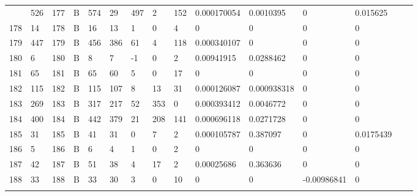 \begin{longtable}{lllllllllllllll}
\begin{comment}
	177 & 526               & 177 & B   & 574               & 29                & 497               & 2    & 152        & 0.000170054    & 0.0010395      & 0             & 0.015625     \\
	178 & 14                & 178 & B   & 16                & 13                & 1                 & 0    & 4          & 0              & 0              & 0             & 0            \\
	179 & 447               & 179 & B   & 456               & 386               & 61                & 4    & 118        & 0.000340107    & 0              & 0             & 0            \\
	180 & 6                 & 180 & B   & 8                 & 7                 & -1                & 0    & 2          & 0.00941915     & 0.0288462      & 0             & 0            \\
	181 & 65                & 181 & B   & 65                & 60                & 5                 & 0    & 17         & 0              & 0              & 0             & 0            \\
	182 & 115               & 182 & B   & 115               & 107               & 8                 & 13   & 31         & 0.000126087    & 0.000938318    & 0             & 0            \\
	183 & 269               & 183 & B   & 317               & 217               & 52                & 353  & 0          & 0.000393412    & 0.0046772      & 0             & 0            \\
	184 & 400               & 184 & B   & 442               & 379               & 21                & 208  & 141        & 0.000696118    & 0.0271728      & 0             & 0            \\
	185 & 31                & 185 & B   & 41                & 31                & 0                 & 7    & 2          & 0.000105787    & 0.387097       & 0             & 0.0175439    \\
	186 & 5                 & 186 & B   & 6                 & 4                 & 1                 & 0    & 2          & 0              & 0              & 0             & 0            \\
	187 & 42                & 187 & B   & 51                & 38                & 4                 & 17   & 2          & 0.00025686     & 0.363636       & 0             & 0            \\
	188 & 33                & 188 & B   & 33                & 30                & 3                 & 0    & 10         & 0              & 0              & -0.00986841   & 0            \\

\end{comment}
\end{longtable}
